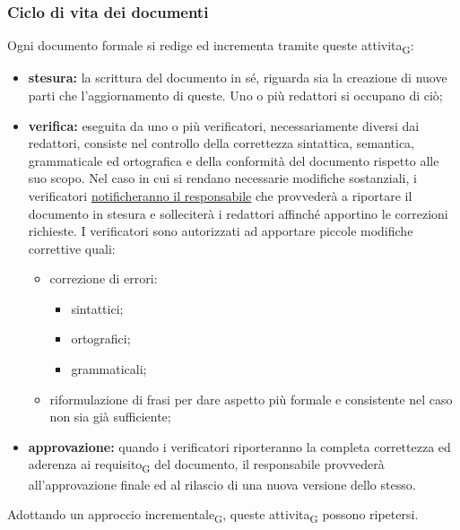     \subsubsection{Ciclo di vita dei documenti}
    \label{ciclovitadoc}
    Ogni documento formale si redige ed incrementa tramite queste attivita\textsubscript{G}:
    \begin{itemize}
        \item \textbf{stesura: }la scrittura del documento in sé, riguarda sia la creazione di nuove parti che l'aggiornamento di queste. Uno o più redattori si occupano di ciò;
        \item \textbf{verifica: }eseguita da uno o più verificatori, necessariamente diversi dai redattori, consiste nel controllo della correttezza sintattica, semantica, grammaticale ed ortografica e della conformità del documento rispetto alle suo scopo. Nel caso in cui si rendano necessarie modifiche sostanziali, i verificatori \hyperref[risoluzioneproblemi]{notificheranno il responsabile} che provvederà a riportare il documento in stesura e solleciterà i redattori affinché apportino le correzioni richieste. I verificatori sono autorizzati ad apportare piccole modifiche correttive quali:
        \begin{itemize}
            \item correzione di errori:
                \begin{itemize}
                    \item sintattici;
                    \item ortografici;
                    \item grammaticali;
                \end{itemize}

            \item riformulazione di frasi per dare aspetto più formale e consistente nel caso non sia già sufficiente;
        \end{itemize}
        \item \textbf{approvazione: }quando i verificatori riporteranno la completa correttezza ed aderenza ai requisito\textsubscript{G} del documento, il responsabile provvederà all'approvazione finale ed al rilascio di una nuova versione dello stesso.
    \end{itemize}
    Adottando un approccio incrementale\textsubscript{G}, queste attivita\textsubscript{G} possono ripetersi.
